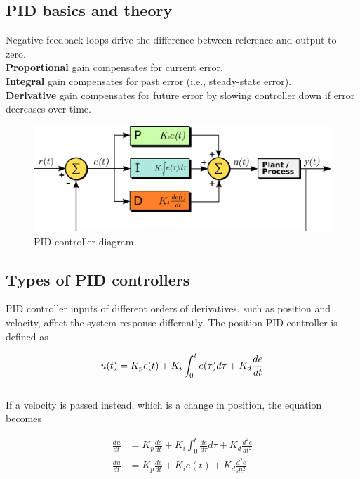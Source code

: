 \documentclass[10pt,conference,compsoc]{IEEEtran}
\begin{document}
\subsection{PID basics and theory}

\noindent Negative feedback loops drive the difference between \gls{reference}
and \gls{output} to zero. \\

\noindent \textbf{Proportional} gain compensates for current \gls{error}. \\
\textbf{Integral} gain compensates for past error (i.e.,
\gls{steady-state error}). \\
\textbf{Derivative} gain compensates for future error by slowing controller down
  if error decreases over time.

\begin{figure}[H]
  \includegraphics[width=\linewidth]{figs/PID_diagram.png}
  \caption{PID controller diagram \cite{bib:PID_diagram}}
\end{figure}

\subsection{Types of PID controllers}

\noindent PID controller inputs of different orders of derivatives, such as
position and velocity, affect the system response differently. The position PID
controller is defined as

\begin{equation}
  u(t) = K_p e(t) + K_i \int_0^t e(\tau) d\tau + K_d \frac{de}{dt} \\
\end{equation}
\\
\noindent If a velocity is passed instead, which is a change in position, the
equation becomes

\begin{align}
  \frac{du}{dt} &= K_p \frac{de}{dt} + K_i \int_0^t \frac{de}{d\tau} d\tau +
    K_d \frac{d^2e}{dt^2} \nonumber \\
  \frac{du}{dt} &= K_p \frac{de}{dt} + K_i e(t) + K_d \frac{d^2e}{dt^2}
\end{align}
\end{document}
